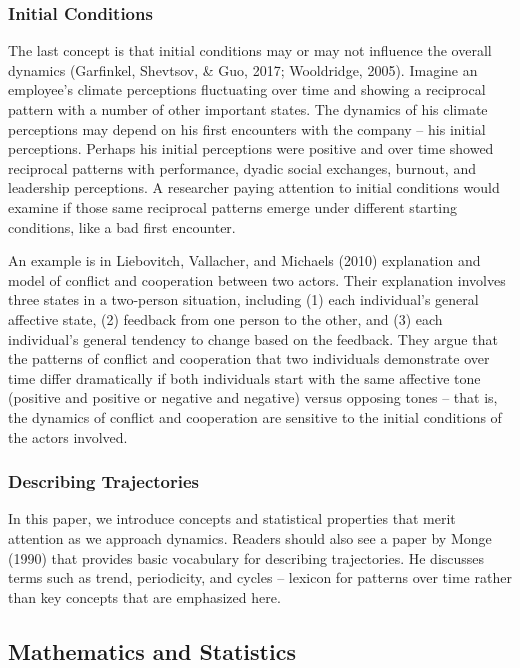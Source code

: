 \documentclass[english,,man]{apa6}
\theoremstyle{definition}
\theoremstyle{definition}
\theoremstyle{definition}
\theoremstyle{remark}
\begin{document}
\hypertarget{initial-conditions}{%
\subsubsection{Initial Conditions}\label{initial-conditions}}

The last concept is that initial conditions may or may not influence the
overall dynamics (Garfinkel, Shevtsov, \& Guo, 2017; Wooldridge, 2005).
Imagine an employee's climate perceptions fluctuating over time and
showing a reciprocal pattern with a number of other important states.
The dynamics of his climate perceptions may depend on his first
encounters with the company -- his initial perceptions. Perhaps his
initial perceptions were positive and over time showed reciprocal
patterns with performance, dyadic social exchanges, burnout, and
leadership perceptions. A researcher paying attention to initial
conditions would examine if those same reciprocal patterns emerge under
different starting conditions, like a bad first encounter.

An example is in Liebovitch, Vallacher, and Michaels (2010) explanation
and model of conflict and cooperation between two actors. Their
explanation involves three states in a two-person situation, including
(1) each individual's general affective state, (2) feedback from one
person to the other, and (3) each individual's general tendency to
change based on the feedback. They argue that the patterns of conflict
and cooperation that two individuals demonstrate over time differ
dramatically if both individuals start with the same affective tone
(positive and positive or negative and negative) versus opposing tones
-- that is, the dynamics of conflict and cooperation are sensitive to
the initial conditions of the actors involved.

\hypertarget{describing-trajectories}{%
\subsubsection{Describing Trajectories}\label{describing-trajectories}}

In this paper, we introduce concepts and statistical properties that
merit attention as we approach dynamics. Readers should also see a paper
by Monge (1990) that provides basic vocabulary for describing
trajectories. He discusses terms such as trend, periodicity, and cycles
-- lexicon for patterns over time rather than key concepts that are
emphasized here.

\hypertarget{mathematics-and-statistics}{%
\subsection{Mathematics and
Statistics}\label{mathematics-and-statistics}}
\end{document}
